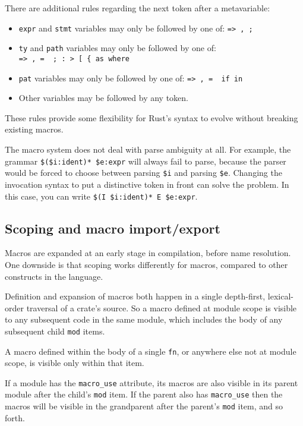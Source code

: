 \documentclass[a4paper,]{book}
\begin{document}
There are additional rules regarding the next token after a
metavariable:

\begin{itemize}
\itemsep1pt\parskip0pt
\item
  \texttt{expr} and \texttt{stmt} variables may only be followed by one
  of: \texttt{=\textgreater{}\ ,\ ;}
\item
  \texttt{ty} and \texttt{path} variables may only be followed by one
  of:
  \texttt{=\textgreater{}\ ,\ =\ \textbar{}\ ;\ :\ \textgreater{}\ {[}\ \{\ as\ where}
\item
  \texttt{pat} variables may only be followed by one of:
  \texttt{=\textgreater{}\ ,\ =\ \textbar{}\ if\ in}
\item
  Other variables may be followed by any token.
\end{itemize}

These rules provide some flexibility for Rust's syntax to evolve without
breaking existing macros.

The macro system does not deal with parse ambiguity at all. For example,
the grammar \texttt{\$(\$i:ident)*\ \$e:expr} will always fail to parse,
because the parser would be forced to choose between parsing
\texttt{\$i} and parsing \texttt{\$e}. Changing the invocation syntax to
put a distinctive token in front can solve the problem. In this case,
you can write \texttt{\$(I\ \$i:ident)*\ E\ \$e:expr}.

\subsection{Scoping and macro
import/export}\label{scoping-and-macro-importexport}

Macros are expanded at an early stage in compilation, before name
resolution. One downside is that scoping works differently for macros,
compared to other constructs in the language.

Definition and expansion of macros both happen in a single depth-first,
lexical-order traversal of a crate's source. So a macro defined at
module scope is visible to any subsequent code in the same module, which
includes the body of any subsequent child \texttt{mod} items.

A macro defined within the body of a single \texttt{fn}, or anywhere
else not at module scope, is visible only within that item.

If a module has the \texttt{macro\_use} attribute, its macros are also
visible in its parent module after the child's \texttt{mod} item. If the
parent also has \texttt{macro\_use} then the macros will be visible in
the grandparent after the parent's \texttt{mod} item, and so forth.
\end{document}
